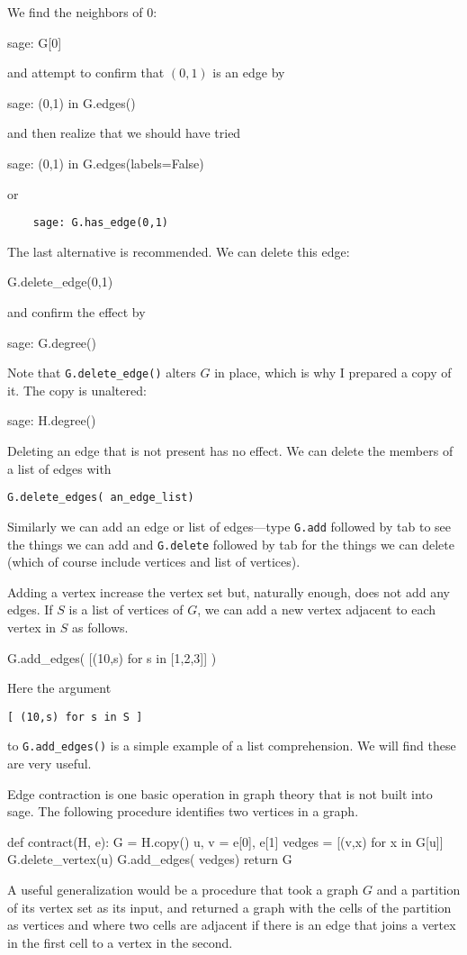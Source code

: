 {We find the neighbors of 0:
\begin{sageexample}
    sage: G[0]
\end{sageexample}
and attempt to confirm that $(0,1)$ is an edge by
\begin{sageexample}
    sage: (0,1) in G.edges()
\end{sageexample}
and then realize that we should have tried
\begin{sageexample}
    sage: (0,1) in G.edges(labels=False)
\end{sageexample}
or
\begin{verbatim}
    sage: G.has_edge(0,1)
\end{verbatim}
The last alternative is recommended.
We can delete this edge:
\begin{sageblock}
    G.delete_edge(0,1)
\end{sageblock}
and confirm the effect by
\begin{sageexample}
    sage: G.degree()
\end{sageexample}
Note that \verb|G.delete_edge()| alters $G$ in place, which is why I
prepared a copy of it. The copy is unaltered:
\begin{sageexample}
    sage: H.degree()
\end{sageexample}
Deleting an edge that is not present has no effect. We can delete
the members of a list of edges with 
\begin{center}
    \verb|G.delete_edges( an_edge_list)|
\end{center}
Similarly we can add an edge or list of edges---type \verb|G.add|
followed by tab to see the things we can add and \verb|G.delete|
followed by tab for the things we can delete (which of course include
vertices and list of vertices).

Adding a vertex increase the vertex set but, naturally enough, does
not add any edges.
If $S$ is a list of vertices of $G$, we can add a new vertex adjacent to 
each vertex in $S$ as follows.
\begin{sageblock}
    G.add_edges( [(10,s) for s in [1,2,3]] )
\end{sageblock}
Here the argument 
\begin{center}
    \verb|[ (10,s) for s in S ]|
\end{center} 
to \verb|G.add_edges()| is a simple example of a list comprehension.  
We will find these are very useful.

Edge contraction is one basic operation in graph theory that is not built 
into sage.  The following procedure identifies two vertices in a graph.
\begin{sageblock} 
def contract(H, e):
    G = H.copy() 
    u, v = e[0], e[1]
    vedges = [(v,x) for x in G[u]]  
    G.delete_vertex(u)
    G.add_edges( vedges)
    return G
\end{sageblock}
A useful generalization would be a procedure that took a graph $G$
and a partition of its vertex set as its input, and returned
a graph with the cells of the partition as vertices and where
two cells are adjacent if there is an edge that joins a vertex
in the first cell to a vertex in the second.


}
